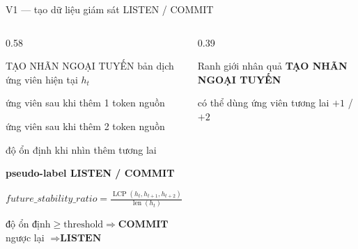 \documentclass[aspectratio=169,11pt]{beamer}
\begin{document}
\begin{frame}{V1 --- tạo dữ liệu giám sát LISTEN / COMMIT}
  \begin{columns}[T,onlytextwidth]
    \begin{column}{0.58\textwidth}
      \begin{block}{TẠO NHÃN NGOẠI TUYẾN}
        \centering\scriptsize
        bản dịch ứng viên hiện tại $h_t$\par
        \vspace{-0.15em}{\color{TimelyTeal}$\downarrow$}\par
        ứng viên sau khi thêm 1 token nguồn\par
        \vspace{-0.15em}{\color{TimelyTeal}$\downarrow$}\par
        ứng viên sau khi thêm 2 token nguồn\par
        \vspace{-0.15em}{\color{TimelyTeal}$\downarrow$}\par
        độ ổn định khi nhìn thêm tương lai\par
        \vspace{-0.15em}{\color{TimelyTeal}$\downarrow$}\par
        \textbf{pseudo-label LISTEN / COMMIT}
      \end{block}
      \vspace{0.25em}
      \centering\scriptsize
      $\displaystyle \mathit{future\_stability\_ratio}
        = \frac{\operatorname{LCP}(h_t,h_{t+1},h_{t+2})}{\operatorname{len}(h_t)}$

      \vspace{0.35em}
      $\text{độ ổn định}\geq \text{threshold} \Rightarrow \textbf{COMMIT}$
      \quad ngược lại $\Rightarrow \textbf{LISTEN}$
    \end{column}
    \begin{column}{0.39\textwidth}
      \begin{alertblock}{Ranh giới nhân quả}
        \scriptsize
        \textbf{TẠO NHÃN NGOẠI TUYẾN}\par
        có thể dùng ứng viên tương lai $+1$ / $+2$


\end{alertblock}
\end{column}
\end{columns}
\end{frame}
\end{document}
